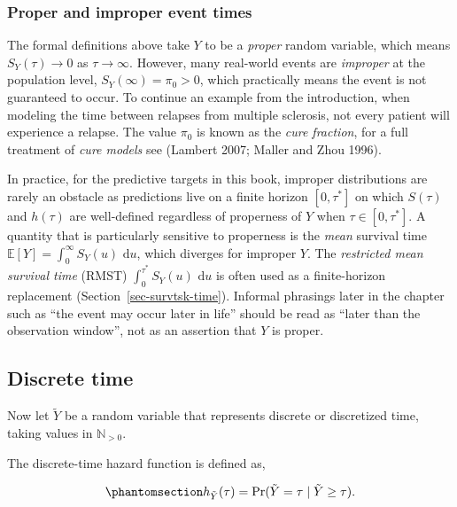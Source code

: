\documentclass[
  letterpaper,
  krantz2]{style/krantz}
\begin{document}
\subsubsection*{Proper and improper event
times}\label{proper-and-improper-event-times}

The formal definitions above take \(Y\) to be a \emph{proper} random
variable, which means \(S_Y(\tau) \to 0\) as
\(\tau \to \infty\). However, many real-world events are \emph{improper}
at the population level,
\(S_Y(\infty) = \pi_0 > 0\), which practically means the event is not
guaranteed to occur. To continue an example from the introduction, when
modeling the time between relapses from multiple sclerosis, not every
patient will experience a relapse. The value \(\pi_0\) is known as the
\emph{cure fraction}, for a full treatment of \emph{cure models} see
(Lambert 2007; Maller and Zhou 1996).

In practice, for the predictive targets in this book, improper
distributions are rarely an obstacle as predictions live on a finite
horizon \([0, \tau^*]\) on which \(S(\tau)\) and \(h(\tau)\) are
well-defined regardless of properness of \(Y\) when
\(\tau \in [0, \tau^*]\). A quantity that is particularly sensitive to
properness is the \emph{mean} survival time
\(\mathbb{E}[Y] = \int_0^\infty S_Y(u)\,\,\mathrm{d}u\), which diverges
for improper \(Y\). The \emph{restricted mean survival time}
(RMST)
\(\int_0^{\tau^*} S_Y(u)\,\,\mathrm{d}u\) is often used as a
finite-horizon replacement (Section~\ref{sec-survtsk-time}). Informal
phrasings later in the chapter such as ``the event may occur later in
life'' should be read as ``later than the observation window'', not as
an assertion that \(Y\) is proper.

\subsection{Discrete time}\label{sec-distributions-discrete}

Now let \(\tilde{Y}\) be a random variable that represents discrete or
discretized time, taking values in
\(\mathbb{N}_{> 0}\).

The discrete-time hazard function is defined as,

\begin{equation}\phantomsection\label{eq-discrete-hazard}{
h_{\tilde{Y}}(\tau) = \Pr(\tilde{Y}=\tau \mid \tilde{Y} \geq \tau).
}\end{equation}
\end{document}
